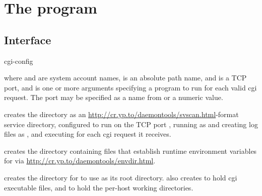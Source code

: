
\chapter{The  program}

\section{Interface}
\begin{code}
  cgi-config     
\end{code}
where  and  are system account names,
 is an absolute path name, and  is a TCP port,
and  is one or more arguments specifying a program to run
for each valid cgi request.  The port may be specified as a name from
 or a numeric value.

 creates the directory  as an
\href{svscan}{http://cr.yp.to/daemontools/svscan.html}-format service
directory, configured to run  on the TCP port
, running  as  and creating log
files as , and executing  for each cgi
request it receives.

 creates the directory 
containing files that establish runtime environment variables for
 via \href{envdir}{http://cr.yp.to/daemontools/envdir.html}.

 creates the directory  for
 to use as its root directory.   also
creates  to hold cgi executable files, and
 to hold the per-host working directories.


